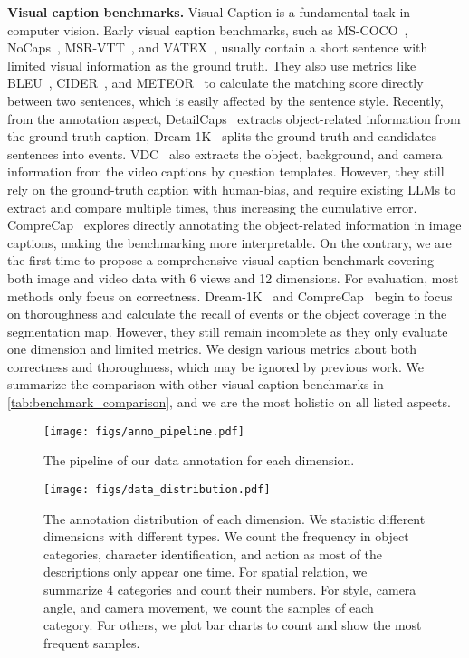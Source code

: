 \noindent\textbf{Visual caption benchmarks.}
Visual Caption is a fundamental task in computer vision. Early visual caption benchmarks, such as MS-COCO~\cite{mscoco}, NoCaps~\cite{nocaps}, MSR-VTT~\cite{msrvtt}, and VATEX~\cite{vatex}, usually contain a short sentence with limited visual information as the ground truth. They also use metrics like BLEU~\cite{papinesi2002bleu}, CIDER~\cite{vedantam2015cider}, and METEOR~\cite{banerjee2005meteor} to calculate the matching score directly between two sentences, which is easily affected by the sentence style. Recently, from the annotation aspect, DetailCaps~\cite{detailcaps} extracts object-related information from the ground-truth caption, Dream-1K~\cite{dream1k} splits the ground truth and candidates sentences into events. VDC~\cite{auroracap} also extracts the object, background, and camera information from the video captions by question templates. However, they still rely on the ground-truth caption with human-bias, and require existing LLMs to extract and compare multiple times, thus increasing the cumulative error. CompreCap~\cite{comprecap} explores directly annotating the object-related information in image captions, making the benchmarking more interpretable. On the contrary, we are the first time to propose a comprehensive visual caption benchmark covering both image and video data with 6 views and 12 dimensions. For evaluation, most methods only focus on correctness. Dream-1K~\cite{dream1k} and CompreCap~\cite{comprecap} begin to focus on thoroughness and calculate the recall of events or the object coverage in the segmentation map. However, they still remain incomplete as they only evaluate one dimension and limited metrics. We design various metrics about both correctness and thoroughness, which may be ignored by previous work. We summarize the comparison with other visual caption benchmarks in \cref{tab:benchmark_comparison}, and we are the most holistic on all listed aspects.

\begin{figure}[!t]
\centering
\texttt{[image: figs/anno\_pipeline.pdf]}
\caption{The pipeline of our data annotation for each dimension.}
\label{fig:anno_pipeline}
\vspace{-12pt}
\end{figure}


\begin{figure*}[!t]
\centering
\texttt{[image: figs/data\_distribution.pdf]}
\vspace{-8pt}
\caption{The annotation distribution of each dimension. We statistic different dimensions with different types. We count the frequency in object categories, character identification, and action as most of the descriptions only appear one time. For spatial relation, we summarize 4 categories and count their numbers. For style, camera angle, and camera movement, we count the samples of each category. For others, we plot bar charts to count and show the most frequent samples.}
\label{fig:gt_distribution}
\end{figure*}



